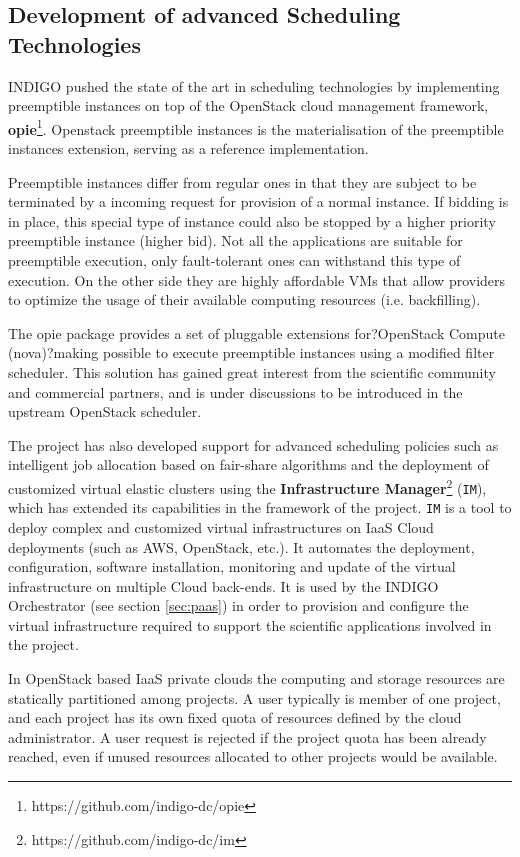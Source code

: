 \documentclass{article}
\begin{document}
\subsection{Development of advanced Scheduling Technologies}
\label{sec:sched}

INDIGO pushed the  state  of  the  art  in  scheduling  technologies  by  implementing  preemptible instances  on  top  of  the  OpenStack\cite{OPENSTACK}  cloud  management  framework, {\bf opie}\footnote{https://github.com/indigo-dc/opie}. Openstack preemptible instances is the materialisation of the preemptible instances extension, serving as a reference implementation.

Preemptible instances differ from regular ones in that they are subject to be terminated by a incoming request for provision of a normal instance. If bidding is in place, this special type of instance could also be stopped by a higher priority preemptible instance (higher bid). Not all the applications are suitable for preemptible execution, only fault-tolerant ones can withstand this type of execution. On the other side they are highly affordable VMs that allow providers to optimize the usage of their available computing resources (i.e. backfilling).

The opie package 
provides a set of pluggable extensions for?OpenStack Compute (nova)?making possible to execute preemptible instances using a modified filter scheduler. This solution has gained great interest from the scientific community and commercial partners, and is under discussions to  be  introduced  in  the  upstream  OpenStack  scheduler.  

The project has also developed support for advanced scheduling policies such as intelligent job allocation based on fair-share algorithms and the deployment  of customized  virtual elastic clusters using the {\bf Infrastructure Manager}\footnote{https://github.com/indigo-dc/im} ({\tt IM}), which has extended its capabilities in the framework of the project.  {\tt IM} is a tool to deploy complex and customized virtual infrastructures on IaaS Cloud deployments (such as AWS, OpenStack, etc.). It automates the deployment, configuration, software installation, monitoring and update of the virtual infrastructure on multiple Cloud back-ends. It is used by the INDIGO Orchestrator (see section \ref{sec:paas}) in order to provision and configure the virtual infrastructure required to support the scientific applications involved in the project.

In OpenStack based IaaS private clouds the computing and storage resources are statically partitioned among projects. A user typically is member of one project, and each project has its own fixed quota of resources defined by the cloud administrator. A user request is rejected if the project quota has been already reached, even if unused resources allocated to other projects would be available. 
\end{document}
